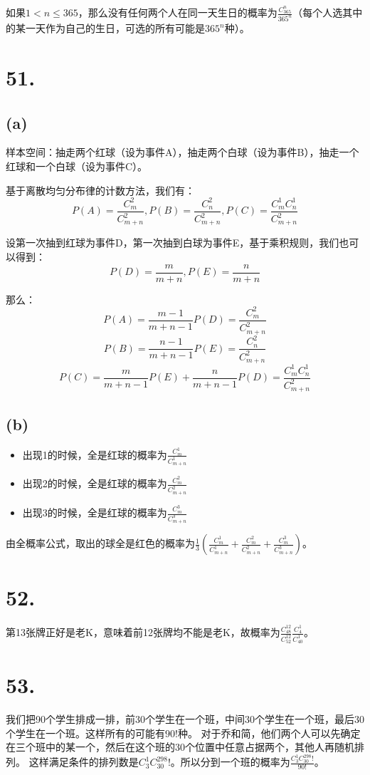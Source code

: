 \documentclass[UTF8]{report}
\begin{document}
        如果$1 < n \leq 365$，那么没有任何两个人在同一天生日的概率为$\frac{C_{365}^n}{365^n}$（每个人选其中的某一天作为自己的生日，可选的所有可能是$365^n$种）。
    \section*{51.}
        \subsection*{(a)}
            样本空间：抽走两个红球（设为事件A），抽走两个白球（设为事件B），抽走一个红球和一个白球（设为事件C）。

            基于离散均匀分布律的计数方法，我们有：
            $$P(A) = \frac{C_m^2}{C_{m + n}^2}, P(B) = \frac{C_n^2}{C_{m + n}^2},
             P(C) = \frac{C_m^1C_n^1}{C_{m + n}^2}$$

            设第一次抽到红球为事件D，第一次抽到白球为事件E，基于乘积规则，我们也可以得到：
            $$P(D) = \frac{m}{m + n}, P(E) = \frac{n}{m + n}$$

            那么：
            $$P(A) = \frac{m - 1}{m + n - 1}P(D) = \frac{C_m^2}{C_{m + n}^2} $$
            $$P(B) = \frac{n - 1}{m + n - 1}P(E) = \frac{C_n^2}{C_{m + n}^2} $$
            $$P(C) = \frac{m}{m + n - 1}P(E) + \frac{n}{m + n - 1}P(D) = \frac{C_m^1C_n^1}{C_{m + n}^2}$$
        \subsection*{(b)}
            \begin{itemize}
                \item 出现1的时候，全是红球的概率为$\frac{C_m^1}{C_{m + n}^1}$
                \item 出现2的时候，全是红球的概率为$\frac{C_m^2}{C_{m + n}^2}$
                \item 出现3的时候，全是红球的概率为$\frac{C_m^3}{C_{m + n}^3}$
            \end{itemize}

            由全概率公式，取出的球全是红色的概率为$\frac{1}{3}(\frac{C_m^1}{C_{m + n}^1} + \frac{C_m^2}{C_{m + n}^2} + \frac{C_m^3}{C_{m + n}^3})$。

    \section*{52.}
        第13张牌正好是老K，意味着前12张牌均不能是老K，故概率为$\frac{C_{48}^{12}}{C_{52}^{12}}\frac{C_4^1}{C_{40}^{1}}$。
    \section*{53.}
        我们把90个学生排成一排，前30个学生在一个班，中间30个学生在一个班，最后30个学生在一个班。这样所有的可能有$90!$种。
        对于乔和简，他们两个人可以先确定在三个班中的某一个，然后在这个班的30个位置中任意占据两个，其他人再随机排列。
        这样满足条件的排列数是$C_3^1C_{30}^298!$。所以分到一个班的概率为$\frac{C_3^1C_{30}^298!}{90!}$。
\end{document}
